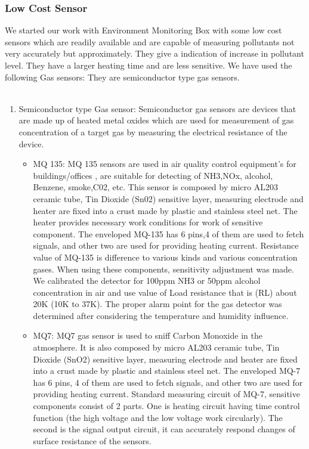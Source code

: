 \subsubsection{Low Cost Sensor}
We started our work with Environment Monitoring Box with some low cost sensors which are readily available and are capable of measuring pollutants not very accurately but approximately. They give a indication of increase in pollutant level. They have a larger heating time and are less sensitive. We have used the following Gas sensors: They are semiconductor type gas sensors.
\\
\\
\begin{enumerate}
	\item Semiconductor type Gas sensor: Semiconductor gas sensors are devices that are made up of heated metal oxides which are used for measurement of gas concentration of a target gas by measuring the electrical resistance of the device.
	\begin{itemize}
		\item MQ 135: MQ 135 sensors are used in air quality control equipment’s for buildings/offices , are suitable for detecting of NH3,NOx, alcohol, Benzene, smoke,C02, etc. This sensor is composed by micro AL203 ceramic tube, Tin Dioxide (Sn02) sensitive layer, measuring electrode and heater are fixed into a crust made by plastic and stainless steel net. The heater provides necessary work conditions for work of sensitive component. The enveloped MQ-135 has 6 pins,4 of them are used to fetch signals, and other two are used for providing heating current. Resistance value of MQ-135 is difference to various kinds and various concentration gases. When using these components, sensitivity adjustment was made. We calibrated the detector for 100ppm NH3 or 50ppm alcohol concentration in air and use value of Load resistance that is (RL) about 20K (10K to 37K). The proper alarm point for the gas detector was determined after considering the temperature and humidity influence.
		\\
		
				\item MQ7: MQ7 gas sensor is used to sniff Carbon Monoxide in the atmosphere. It is also composed by micro AL203 ceramic tube, Tin Dioxide (SnO2) sensitive layer, measuring electrode and heater are fixed into a crust made by plastic and stainless steel net. The enveloped MQ-7 has 6 pins, 4 of them are used to fetch signals, and other two are used for providing heating current. Standard measuring circuit of MQ-7, sensitive components consist of 2 parts. One is heating circuit having time control function (the high voltage and the low voltage work circularly). The second is the signal output circuit, it can accurately respond changes of surface resistance of the sensors.
				\\
				

\end{itemize}
\end{enumerate}
